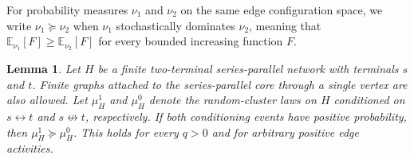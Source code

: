 \documentclass[11pt]{amsart}
\theoremstyle{plain}
\newtheorem{lemma}[theorem]{Lemma}
\theoremstyle{definition}
\theoremstyle{remark}
\begin{document}
For probability measures $\nu_1$ and $\nu_2$ on the same edge configuration space, we write $\nu_1\succeq\nu_2$ when $\nu_1$ stochastically dominates $\nu_2$, meaning that $\mathbb E_{\nu_1}[F]\ge\mathbb E_{\nu_2}[F]$ for every bounded increasing function $F$.

\begin{lemma}
\label{lem:terminal-conditioning-order}
Let $H$ be a finite two-terminal series-parallel network with terminals $s$ and $t$. Finite graphs attached to the series-parallel core through a single vertex are also allowed. Let $\mu_H^1$ and $\mu_H^0$ denote the random-cluster laws on $H$ conditioned on $s\leftrightarrow t$ and $s\nleftrightarrow t$, respectively. If both conditioning events have positive probability, then $\mu_H^1\succeq\mu_H^0$. This holds for every $q>0$ and for arbitrary positive edge activities.
\end{lemma}
\end{document}
